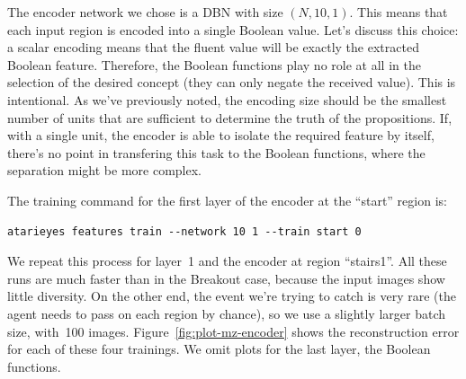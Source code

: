 The encoder network we chose is a DBN with size $(N, 10, 1)$. This means that
each input region is encoded into a single Boolean value. Let's discuss this
choice: a scalar encoding means that the fluent value will be exactly the
extracted Boolean feature. Therefore, the Boolean functions play no role at
all in the selection of the desired concept (they can only negate the received
value).  This is intentional. As we've previously noted, the encoding size
should be the smallest number of units that are sufficient to determine the
truth of the propositions. If, with a single unit, the encoder is able to
isolate the required feature by itself, there's no point in transfering this
task to the Boolean functions, where the separation might be more complex.

The training command for the first layer of the encoder at the ``start''
region is:
\begin{verbatim}
atarieyes features train --network 10 1 --train start 0
\end{verbatim}
We repeat this process for layer~1 and the encoder at region ``stairs1''.
All these runs are much faster than in the Breakout case, because the
input images show little diversity. On the other end, the event we're trying
to catch is very rare (the agent needs to pass on each region by chance), so
we use a slightly larger batch size, with~100 images.
Figure~\ref{fig:plot-mz-encoder} shows the reconstruction error for each of
these four trainings. We omit plots for the last layer, the Boolean functions.

